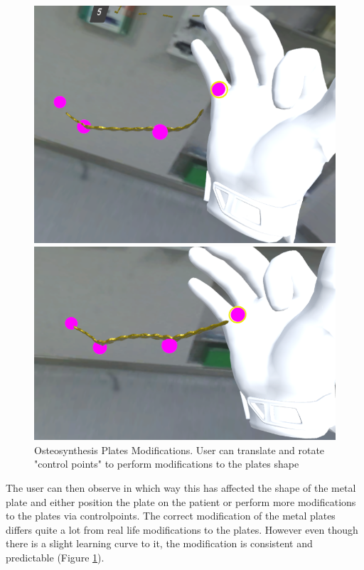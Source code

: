 \begin{figure}
  \centering
  \begin{minipage}{.5\textwidth}
    \centering
    \includegraphics[width=0.95\linewidth]{images/implementation/features/procedures/metal_plates_2.png}
  \end{minipage}%
  \begin{minipage}{.5\textwidth}
    \centering
    \includegraphics[width=0.95\linewidth]{images/implementation/features/procedures/metal_plates_3.png}
  \end{minipage}
  \caption{\label{fig::FeatureMetalPlate2}Osteosynthesis Plates Modifications. User can translate and rotate "control points" to perform modifications to the plates shape} 
\end{figure}

The user can then observe in which way this has affected the shape of the metal plate and either position the plate on the patient or perform more modifications to the plates via controlpoints.
The correct modification of the metal plates differs quite a lot from real life modifications to the plates.
However even though there is a slight learning curve to it, the modification is consistent and predictable (Figure \ref{fig::FeatureMetalPlate2}).

